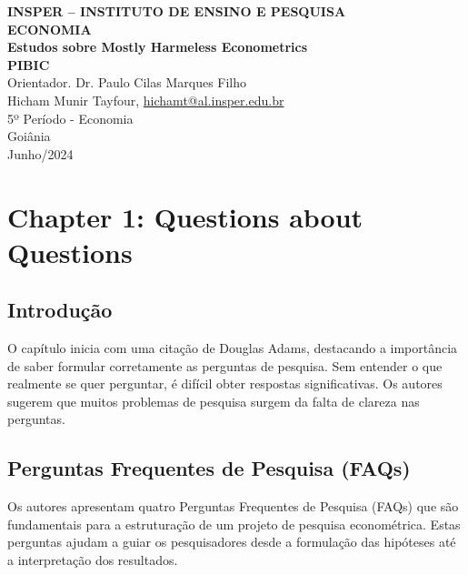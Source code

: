 \documentclass[a4paper,12pt]{article}[abntex2]
\begin{document}
\begin{titlepage}
    \centering
    \vspace*{1cm}
    \Large\textbf{INSPER – INSTITUTO DE ENSINO E PESQUISA}\\
    \Large \textbf{ECONOMIA}\\
    \vspace{1.5cm}
    \Large\textbf{Estudos sobre Mostly Harmeless Econometrics}\\
    \textbf{PIBIC}\\
    \vspace{1.5cm}
    Orientador. Dr. Paulo Cilas Marques Filho\\
    \vfill
    \normalsize
    Hicham Munir Tayfour, \href{mailto:hichamt@al.insper.edu.br}{hichamt@al.insper.edu.br}\\
    5º Período - Economia\\
    \vfill
    Goiânia\\
    Junho/2024
\end{titlepage}

\newpage
\tableofcontents
\thispagestyle{empty} %
\newpage
\setcounter{page}{1} %
\justify
\onehalfspacing

\pagestyle{fancy}
\fancyhf{}
\rhead{\thepage}

\section{Chapter 1: Questions about Questions}

\subsection{Introdução}
O capítulo inicia com uma citação de Douglas Adams, destacando a importância de saber formular corretamente as perguntas de pesquisa. Sem entender o que realmente se quer perguntar, é difícil obter respostas significativas. Os autores sugerem que muitos problemas de pesquisa surgem da falta de clareza nas perguntas.

\subsection{Perguntas Frequentes de Pesquisa (FAQs)}
Os autores apresentam quatro Perguntas Frequentes de Pesquisa (FAQs) que são fundamentais para a estruturação de um projeto de pesquisa econométrica. Estas perguntas ajudam a guiar os pesquisadores desde a formulação das hipóteses até a interpretação dos resultados.
\end{document}
